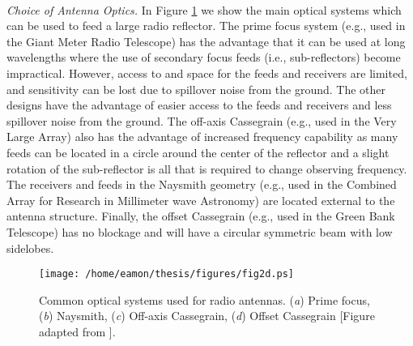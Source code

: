 \\
\textit{Choice of Antenna Optics.} In Figure \ref{fig2.2} we show the main optical systems which can be used to feed a large radio reflector. The prime focus system (e.g., used in the Giant Meter Radio Telescope) has the advantage that it can be used at long wavelengths where the use of secondary focus feeds (i.e., sub-reflectors) become impractical. However, access to and space for the feeds and receivers are limited, and sensitivity can be lost due to spillover noise from the ground. The other designs have the advantage of easier access to the feeds and receivers and less spillover noise from the ground. The off-axis Cassegrain (e.g., used in the Very Large Array) also has the advantage of increased frequency capability as many feeds can be located in a circle around the center of the reflector and a slight rotation of the sub-reflector is all that is required to change observing frequency. The receivers and feeds in the Naysmith geometry (e.g., used in the Combined Array for Research in Millimeter wave Astronomy) are located external to the antenna structure. Finally, the offset Cassegrain (e.g., used in the Green Bank Telescope) has no blockage and will have a circular symmetric beam with low sidelobes.

\begin{figure}[hbt!]
\centering 
          \texttt{[image: /home/eamon/thesis/figures/fig2d.ps]}
\caption[Common optical systems used for radio antennas]{Common optical systems used for radio antennas. (\textit{a}) Prime focus, (\textit{b}) Naysmith, (\textit{c}) Off-axis Cassegrain, (\textit{d}) Offset Cassegrain [Figure adapted from \cite{taylor_1999}].}
\label{fig2.2}
\end{figure}

